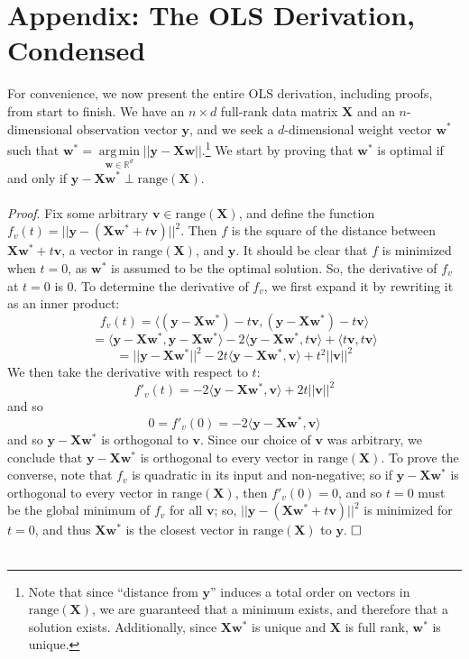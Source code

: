 \documentclass{article}
\DeclareMathOperator*{\argmin}{arg\,min}
\begin{document}
\section{Appendix: The OLS Derivation, Condensed}
For convenience, we now present the entire OLS derivation, including proofs, from start to finish. We have an $n \times d$ full-rank data matrix $\mathbf{X}$ and an $n$-dimensional observation vector $\mathbf{y}$, and we seek a $d$-dimensional weight vector $\mathbf{w^*}$ such that $\mathbf{w^*} = \argmin\limits_{\mathbf{w} \in \mathbb{R}^d} ||\mathbf{y - Xw}||$.\footnote{Note that since ``distance from $\mathbf{y}$'' induces a total order on vectors in $\text{range}(\mathbf{X})$, we are guaranteed that a minimum exists, and therefore that a solution exists. Additionally, since $\mathbf{Xw^*}$ is unique and $\mathbf{X}$ is full rank, $\mathbf{w^*}$ is unique.} We start by proving that $\mathbf{w^*}$ is optimal if and only if $\mathbf{y - Xw^*} \perp \text{range}(\mathbf{X})$. \\\\
\textit{Proof}. Fix some arbitrary $\mathbf{v} \in \text{range}(\mathbf{X})$, and define the function $f_v(t) = ||\mathbf{y} - (\mathbf{Xw^*} + t\mathbf{v})||^2$. Then $f$ is the square of the distance between $\mathbf{Xw^*} + t\mathbf{v}$, a vector in $\text{range}(\mathbf{X})$, and $\mathbf{y}$. It should be clear that $f$ is minimized when $t = 0$, as $\mathbf{w^*}$ is assumed to be the optimal solution. So, the derivative of $f_v$ at $t = 0$ is 0. To determine the derivative of $f_v$, we first expand it by rewriting it as an inner product: $$f_v(t) = \langle (\mathbf{y} - \mathbf{Xw^*}) - t\mathbf{v}, (\mathbf{y} - \mathbf{Xw^*}) - t\mathbf{v} \rangle$$ $$= \langle \mathbf{y} - \mathbf{Xw^*}, \mathbf{y} - \mathbf{Xw^*} \rangle - 2\langle \mathbf{y} - \mathbf{Xw^*}, t\mathbf{v} \rangle + \langle t\mathbf{v}, t\mathbf{v}\rangle $$ $$= ||\mathbf{y} - \mathbf{Xw^*}||^2 - 2t\langle \mathbf{y} - \mathbf{Xw^*}, \mathbf{v}\rangle + t^2||\mathbf{v}||^2$$ We then take the derivative with respect to $t$: $$f'_v(t) = -2\langle \mathbf{y} - \mathbf{Xw^*}, \mathbf{v}\rangle + 2t||\mathbf{v}||^2$$ and so $$0 = f'_v(0) = -2\langle \mathbf{y} - \mathbf{Xw^*}, \mathbf{v} \rangle$$ and so $\mathbf{y - Xw^*}$ is orthogonal to $\mathbf{v}$. Since our choice of $\mathbf{v}$ was arbitrary, we conclude that $\mathbf{y - Xw^*}$ is orthogonal to every vector in $\text{range}(\mathbf{X})$. To prove the converse, note that $f_v$ is quadratic in its input and non-negative; so if $\mathbf{y - Xw^*}$ is orthogonal to every vector in $\text{range}(\mathbf{X})$, then $f'_v(0) = 0$, and so $t = 0$ must be the global minimum of $f_v$ for all $\mathbf{v}$; so, $||\mathbf{y} - (\mathbf{Xw^*} + t\mathbf{v})||^2$ is minimized for $t = 0$, and thus $\mathbf{Xw^*}$ is the closest vector in $\text{range}(\mathbf{X})$ to $\mathbf{y}$. $\hfill\square$ \\\\
\end{document}
